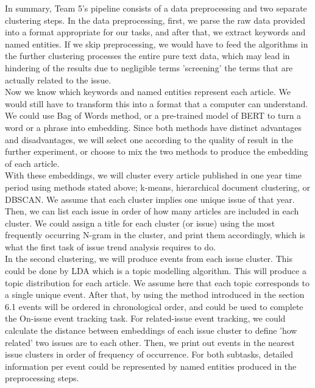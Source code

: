  In summary, Team 5's pipeline consists of a data preprocessing and two separate clustering steps. In the data preprocessing, first, we parse the raw data provided into a format appropriate for our tasks, and after that, we extract keywords and named entities. If we skip preprocessing, we would have to feed the algorithms in the further clustering processes the entire pure text data, which may lead in hindering of the results due to negligible terms 'screening' the terms that are actually related to the issue.\\
 Now we know which keywords and named entities represent each article. We would still have to transform this into a format that a computer can understand. We could use Bag of Words method, or a pre-trained model of BERT to turn a word or a phrase into embedding. Since both methods have distinct advantages and disadvantages, we will select one according to the quality of result in the further experiment, or choose to mix the two methods to produce the embedding of each article.\\
 With these embeddings, we will cluster every article published in one year time period using methods stated above; k-means, hierarchical document clustering, or DBSCAN. We assume that each cluster implies one unique issue of that year. Then, we can list each issue in order of how many articles are included in each cluster. We could assign a title for each cluster (or issue) using the most frequently occurring N-gram in the cluster, and print them accordingly, which is what the first task of issue trend analysis requires to do.\\
 In the second clustering, we will produce events from each issue cluster. This could be done by LDA which is a topic modelling algorithm. This will produce a topic distribution for each article. We assume here that each topic corresponds to a single unique event. After that, by using the method introduced in the section 6.1 events will be ordered in chronological order, and could be used to complete the On-issue event tracking task. For related-issue event tracking, we could calculate the distance between embeddings of each issue cluster to define 'how related' two issues are to each other. Then, we print out events in the nearest issue clusters in order of frequency of occurrence. For both subtasks, detailed information per event could be represented by named entities produced in the preprocessing steps.